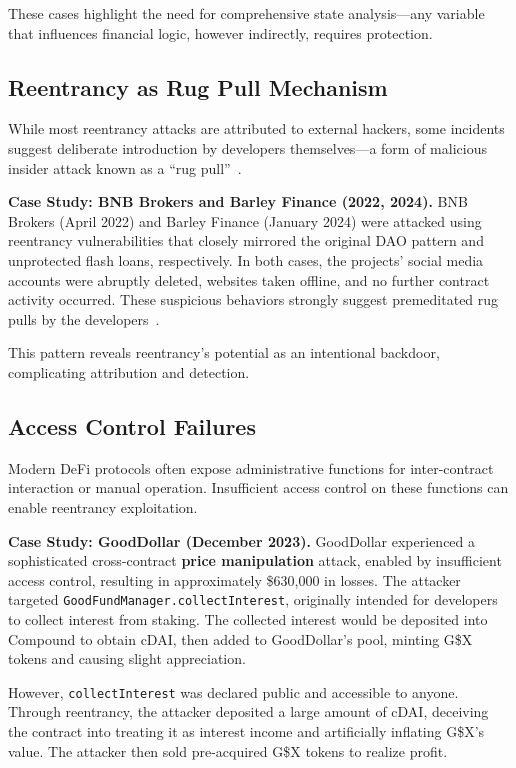These cases highlight the need for comprehensive state analysis---any variable that influences financial logic, however indirectly, requires protection.

\subsection{Reentrancy as Rug Pull Mechanism}
\label{sec:results-rugpull}
\label{case-study:6}

While most reentrancy attacks are attributed to external hackers, some incidents suggest deliberate introduction by developers themselves---a form of malicious insider attack known as a ``rug pull''~\cite{rug-pull-report}.

\textbf{Case Study: BNB Brokers and Barley Finance (2022, 2024).} BNB Brokers (April 2022) and Barley Finance (January 2024) were attacked using reentrancy vulnerabilities that closely mirrored the original DAO pattern and unprotected flash loans, respectively. In both cases, the projects' social media accounts were abruptly deleted, websites taken offline, and no further contract activity occurred. These suspicious behaviors strongly suggest premeditated rug pulls by the developers~\cite{bnb-brokers-newsletter, attack-report:barley-finance}.

This pattern reveals reentrancy's potential as an intentional backdoor, complicating attribution and detection.

\subsection{Access Control Failures}
\label{sec:results-access}
\label{case-study:7}

Modern DeFi protocols often expose administrative functions for inter-contract interaction or manual operation. Insufficient access control on these functions can enable reentrancy exploitation.

\textbf{Case Study: GoodDollar (December 2023).} GoodDollar experienced a sophisticated cross-contract \textbf{price manipulation} attack, enabled by insufficient access control, resulting in approximately \$630,000 in losses. The attacker targeted \lstinline{GoodFundManager.collectInterest}, originally intended for developers to collect interest from staking. The collected interest would be deposited into Compound to obtain cDAI, then added to GoodDollar's pool, minting G\$X tokens and causing slight appreciation.

However, \lstinline{collectInterest} was declared public and accessible to anyone. Through reentrancy, the attacker deposited a large amount of cDAI, deceiving the contract into treating it as interest income and artificially inflating G\$X's value. The attacker then sold pre-acquired G\$X tokens to realize profit.

